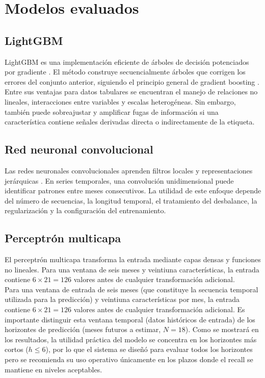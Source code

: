 \section{Modelos evaluados}

\subsection{LightGBM}

LightGBM es una implementación eficiente de árboles de decisión potenciados por gradiente \cite{ke2017lightgbm}. El método construye secuencialmente árboles que corrigen los errores del conjunto anterior, siguiendo el principio general de gradient boosting \cite{friedman2001greedy}. Entre sus ventajas para datos tabulares se encuentran el manejo de relaciones no lineales, interacciones entre variables y escalas heterogéneas. Sin embargo, también puede sobreajustar y amplificar fugas de información si una característica contiene señales derivadas directa o indirectamente de la etiqueta.

\subsection{Red neuronal convolucional}

Las redes neuronales convolucionales aprenden filtros locales y representaciones jerárquicas \cite{lecun2015deep}. En series temporales, una convolución unidimensional puede identificar patrones entre meses consecutivos. La utilidad de este enfoque depende del número de secuencias, la longitud temporal, el tratamiento del desbalance, la regularización y la configuración del entrenamiento.

\subsection{Perceptrón multicapa}

El perceptrón multicapa transforma la entrada mediante capas densas y funciones no lineales. Para una ventana de seis meses y veintiuna características, la entrada contiene $6 \times 21 = 126$ valores antes de cualquier transformación adicional. \\

Para una ventana de entrada de seis meses (que constituye la secuencia temporal utilizada para la predicción) y veintiuna características por mes, la entrada contiene $ 6 \times 21 = 126 $ valores antes de cualquier transformación adicional. Es importante distinguir esta ventana temporal (datos históricos de entrada) de los horizontes de predicción (meses futuros a estimar, $N = 18$). Como se mostrará en los resultados, la utilidad práctica del modelo se concentra en los horizontes más cortos ($h \le 6$), por lo que el sistema se diseñó para evaluar todos los horizontes pero se recomienda su uso operativo únicamente en los plazos donde el recall se mantiene en niveles aceptables. \\

